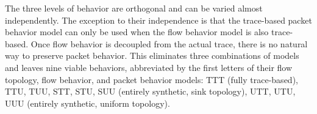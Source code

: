 \documentclass[conference]{IEEEtran}
\newcommand{\caps}[1]{{\small{#1}}}
\begin{document}



The three levels of behavior are orthogonal and can be varied almost independently. The exception to their independence is that the trace-based packet behavior model can only be used when the flow behavior model is also trace-based. Once flow behavior is decoupled from the actual trace, there is no natural way to preserve packet behavior. This eliminates three combinations of models and leaves nine viable behaviors, abbreviated by the first letters of their flow topology, flow behavior, and packet behavior models: \caps{TTT} (fully trace-based), \caps{TTU}, \caps{TUU}, \caps{STT}, \caps{STU}, \caps{SUU} (entirely synthetic, sink topology), \caps{UTT}, \caps{UTU}, \caps{UUU} (entirely synthetic, uniform topology).
\end{document}
